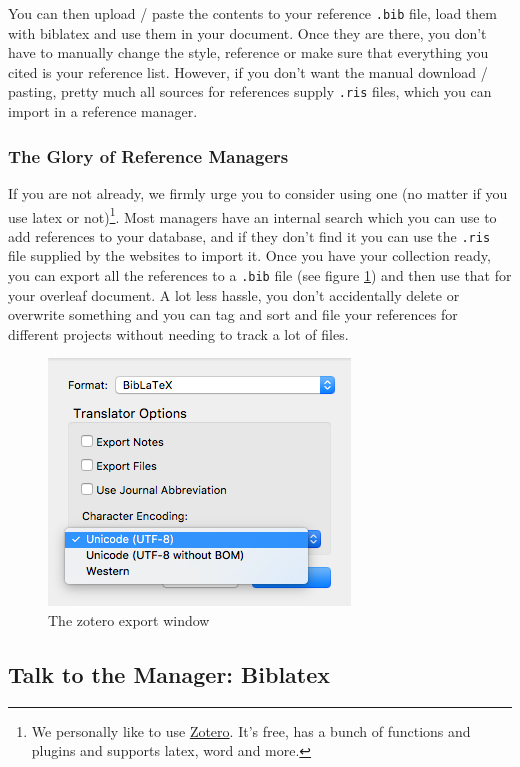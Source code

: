 \documentclass[12pt]{scrarticle}
\begin{document}
You can then upload / paste the contents to your reference \texttt{.bib} file, load them with biblatex and use them in your document. Once  they are there, you don't have to manually change the style, reference or make sure that everything you cited is your reference list. 
However, if you don't want the manual download / pasting, pretty much all sources for references supply \texttt{.ris} files, which you can import in a reference manager.

\subsubsection{The Glory of Reference Managers}
If you are not already, we firmly urge you to consider using one (no matter if you use latex or not)\footnote{We personally like to use \href{https://www.zotero.org/}{Zotero}. It's free, has a bunch of functions and plugins and supports latex, word and more.}. Most managers have an internal search which you can use to add references to your database, and if they don't find it you can use the \texttt{.ris} file supplied by the websites to import it. Once you have your collection ready, you can export all the references to a \texttt{.bib} file (see figure \ref{fig:zotero}) and then use that for your overleaf document. A lot less hassle, you don't accidentally delete or overwrite something and you can tag and sort and file your references for different projects without needing to track a lot of files.

\begin{figure}[h]
    \centering
    \includegraphics[width=.4\textwidth]{Running-Example/zotero_export.png}
    \caption{The zotero export window}
    \label{fig:zotero}
\end{figure}

\subsection{Talk to the Manager: Biblatex}
\end{document}
